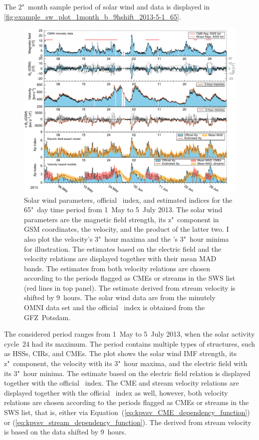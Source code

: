 The 2"~month sample period of solar wind and \Kp{} data is displayed in \autoref{fig:example_sw_plot_1month_b_9hshift_2013-5-1_65}.
\begin{figure}[htb]
	\centering
	\includegraphics[width=\textwidth]{figures_of_mine/chapter2/example_sw_plot_1month_b_9hshift_2013-5-1_65.pdf}
	\caption[I created the figure myself.]
	{Solar wind parameters, official \Kp~index, and estimated \Kp{} indices for the 65"~day time period from 1~May to 5~July 2013. The solar wind parameters are the magnetic field strength, its z"~component in GSM coordinates, the velocity, and the product of the latter two. I also plot the velocity's 3"~hour maxima and the \vBz{}'s 3"~hour minima for illustration. The \Kp{} estimates based on the electric field and the velocity relations are displayed together with their mean MAD bands. The \Kp{} estimates from both velocity relations are chosen according to the periods flagged as CMEs or streams in the SWS list (red lines in top panel). The \Kp{} estimate derived from stream velocity is shifted by 9~hours. The solar wind data are from the minutely OMNI data set and the official \Kp~index is obtained from the GFZ~Potsdam.}
	\label{fig:example_sw_plot_1month_b_9hshift_2013-5-1_65}
\end{figure}
The considered period ranges from 1~May to 5~July 2013, when the solar activity cycle~24 had its maximum. The period contains multiple types of structures, such as HSSs, CIRs, and CMEs.
The plot shows the solar wind IMF strength, its z"~component, the velocity with its 3"~hour maxima, and the electric field \vBz{} with its 3"~hour minima. The \Kp{} estimate based on the electric field relation is displayed together with the official \Kp~index. The CME and stream velocity relations are displayed together with the official \Kp~index as well, however, both velocity relations are chosen according to the periods flagged as CMEs or streams in the SWS list, that is, either via Equation~(\ref{eq:kpvsv_CME_dependency_function}) or (\ref{eq:kpvsv_stream_dependency_function}). The \Kp{} derived from stream velocity is based on the data shifted by 9~hours.

